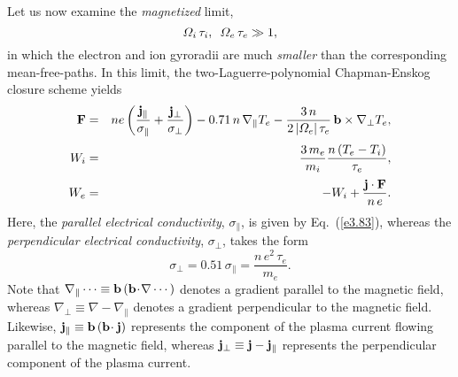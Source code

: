 Let us now examine the {\em magnetized}\/ limit,
\begin{equation}
{\mit\Omega}_i\,\tau_i, \,\,\,{\mit\Omega}_e\, \tau_e \gg 1,
\end{equation}
in which the electron and ion gyroradii are much {\em smaller}\/ than the
corresponding mean-free-paths. In this limit, the two-Laguerre-polynomial
Chapman-Enskog closure scheme yields
\begin{eqnarray}\label{e3.91a}
{\bf F}&=& ne\left(\frac{{\bf j}_\parallel}{\sigma_\parallel}
+\frac{{\bf j}_\perp}{\sigma_\perp}\right) -0.71\,n\,\nabla_\parallel T_e
-\frac{3\,n}{2\,|{\mit\Omega}_e|\,\tau_e}\,{\bf b}\times\nabla_\perp T_e,
\\[0.5ex]
W_i &=& \frac{3\,m_e}{m_i} \frac{n\,(T_e-T_i)}{\tau_e},\\[0.5ex]
W_e &=& -W_i + \frac{ {\bf j}\cdot {\bf F} }{n \,e}.
\end{eqnarray}
Here, the {\em parallel electrical conductivity}, $\sigma_\parallel$, is given by Eq.~(\ref{e3.83}),
whereas the {\em perpendicular electrical conductivity}, $\sigma_\perp$,  takes the form
\begin{equation}\label{e3.92}
\sigma_\perp = 0.51\,\sigma_\parallel = \frac{n\,e^2\,\tau_e}{m_e}.
\end{equation}
Note that $\nabla_\parallel\cdots \equiv {\bf b}\,({\bf b}\!\cdot\!\nabla
\cdots)$ denotes a
gradient parallel to the magnetic field, whereas $\nabla_\perp \equiv
 \nabla-\nabla_\parallel$ denotes a gradient perpendicular to the magnetic
field. Likewise, ${\bf j}_\parallel \equiv {\bf b}\,({\bf b}\!\cdot{\bf j})$
represents the component of the plasma current flowing parallel to the
magnetic field, whereas ${\bf j}_\perp \equiv {\bf j} - {\bf j}_\parallel$
represents the perpendicular component of the plasma current.

